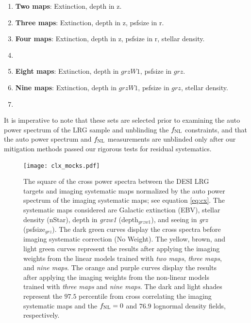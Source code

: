 \begin{enumerate}[itemindent=*]
\item \textbf{Two maps}: Extinction, depth in z.
\item \textbf{Three maps}: Extinction, depth in z, psfsize in r.
\item \textbf{Four maps}: Extinction, depth in z, psfsize in r, stellar density.
\item {}
\item \textbf{Eight maps}: Extinction, depth in $grzW1$, psfsize in $grz$.
\item \textbf{Nine maps}: Extinction, depth in $grzW1$, psfsize in $grz$, stellar density.
\item {}
\end{enumerate}
It is imperative to note that these sets are selected prior to examining the auto power spectrum of the LRG sample and unblinding the $f_{\rm NL}$ constraints, and that the auto power spectrum and $f_{\rm NL}$ measurements are unblinded only after our mitigation methods passed our rigorous tests for residual systematics. 

\begin{figure}
\centering
\texttt{[image: clx\_mocks.pdf]}
\caption{The square of the cross power spectra between the DESI LRG targets and imaging systematic maps normalized by the auto power spectrum of the imaging systematic maps; see equation \ref{eq:cx}. The systematic maps considered are Galactic extinction (EBV), stellar density (nStar), depth in \textit{grzw1} (depth$_{grzw1}$), and seeing in \textit{grz} (psfsize$_{grz}$). The dark green curves display the cross spectra before imaging systematic correction (No Weight). The yellow, brown, and light green curves represent the results after applying the imaging weights from the linear models trained with \textit{two maps}, \textit{three maps}, and \textit{nine maps}. The orange and purple curves display the results after applying the imaging weights from the non-linear models trained with \textit{three maps} and \textit{nine maps}. The dark and light shades represent the $97.5$ percentile from cross correlating the imaging systematic maps and the $f_{\rm NL}=0$ and $76.9$ lognormal density fields, respectively.}\label{fig:clxmock}
\end{figure}

